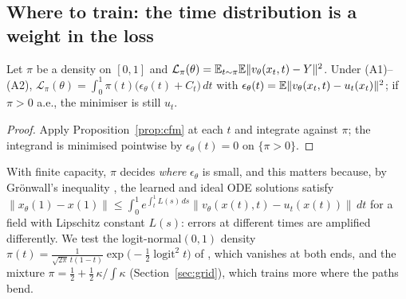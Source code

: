 \subsection{Where to train: the time distribution is a weight in the loss}\label{sec:tdist}
\begin{proposition}\label{prop:tdist}
Let $\pi$ be a density on $[0,1]$ and $\mathcal L_\pi(\theta)=\mathbb{E}_{t\sim\pi}\mathbb{E}\|v_\theta(x_t,t)-Y\|^2$. Under (A1)--(A2), $\mathcal L_\pi(\theta)=\int_0^1\pi(t)\big(\epsilon_\theta(t)+C_t\big)\,dt$ with $\epsilon_\theta(t)=\mathbb{E}\|v_\theta(x_t,t)-u_t(x_t)\|^2$; if $\pi>0$ a.e., the minimiser is still $u_t$.
\end{proposition}
\begin{proof}
Apply Proposition~\ref{prop:cfm} at each $t$ and integrate against $\pi$; the integrand is minimised pointwise by $\epsilon_\theta(t)=0$ on $\{\pi>0\}$.
\end{proof}
With finite capacity, $\pi$ decides \emph{where} $\epsilon_\theta$ is small, and this matters because, by Gr\"onwall's inequality \citep[\S I.10]{hairer1993ode}, the learned and ideal ODE solutions satisfy $\|x_\theta(1)-x(1)\|\le\int_0^1e^{\int_t^1L(s)\,ds}\|v_\theta(x(t),t)-u_t(x(t))\|\,dt$ for a field with Lipschitz constant $L(s)$: errors at different times are amplified differently. We test the logit-normal$(0,1)$ density $\pi(t)=\frac{1}{\sqrt{2\pi}\,t(1-t)}\exp\!\big(-\tfrac12\operatorname{logit}^2t\big)$ of \citet{esser2024sd3}, which vanishes at both ends, and the mixture $\pi=\tfrac12+\tfrac12\,\kappa/\!\int\kappa$ (Section~\ref{sec:grid}), which trains more where the paths bend.

